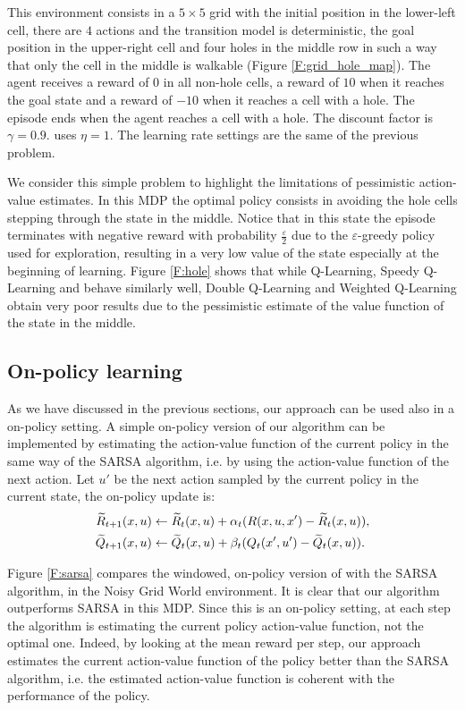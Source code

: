 \documentclass[conference]{IEEEtran}
\begin{document}
This environment consists in a $5 \times 5$ grid with the initial position in the lower-left cell, there are $4$ actions and the transition model is deterministic, the goal position in the upper-right cell and four holes in the middle row in such a way that only the cell in the middle is walkable (Figure \ref{F:grid_hole_map}). The agent receives a reward of $0$ in all non-hole cells, a reward of $10$ when it reaches the goal state and a reward of $-10$ when it reaches a cell with a hole. The episode ends when the agent reaches a cell with a hole. The discount factor is $\gamma = 0.9$. \alg uses $\eta = 1$.
The learning rate settings are the same of the previous problem.

We consider this simple problem to highlight the limitations of pessimistic action-value estimates. In this MDP the optimal policy consists in avoiding the hole cells stepping through the state in the middle. Notice that in this state the episode terminates with negative reward with probability $\frac{\varepsilon}{2}$ due to the $\varepsilon$-greedy policy used for exploration, resulting in a very low value of the state especially at the beginning of learning. Figure \ref{F:hole} shows that while Q-Learning, Speedy Q-Learning and \alg behave similarly well, Double Q-Learning and Weighted Q-Learning obtain very poor results due to the pessimistic estimate of the value function of the state in the middle.

\subsection{On-policy learning}
As we have discussed in the previous sections, our approach can be used also in a on-policy setting. A simple on-policy version of our algorithm can be implemented by estimating the action-value function of the current policy in the same way of the SARSA algorithm, i.e. by using the action-value function of the next action. Let $u'$ be the next action sampled by the current policy in the current state, the on-policy update is:
\begin{align*}
\widetilde{R}_{t+1}(x,u) & \leftarrow\widetilde{R}_t(x,u)+\alpha_t(R(x,u,x')-\widetilde{R}_t(x,u)),\\
\widetilde{Q}_{t+1}(x,u) & \leftarrow\widetilde{Q}_t(x,u)+\beta_t(Q_t(x',u')-\widetilde{Q}_t(x,u)).
\end{align*}

Figure \ref{F:sarsa} compares the windowed, on-policy version of \alg with the SARSA algorithm, in the Noisy Grid World environment. It is clear that our algorithm outperforms SARSA in this MDP.
Since this is an on-policy setting, at each step the algorithm is estimating the current policy action-value function, not the optimal one. Indeed, by looking at the mean reward per step, our approach estimates the current action-value function of the policy better than the SARSA algorithm, i.e. the estimated action-value function is coherent with the performance of the policy.
\end{document}
